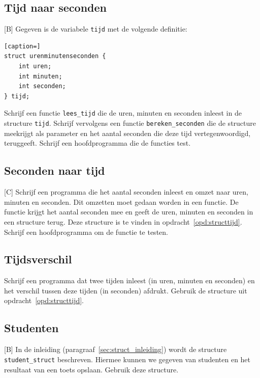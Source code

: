 \documentclass[a4paper,10pt,fleqn,twoside]{article}
\begin{document}
\begin{figure}[H]
\centering
{}
\end{figure}

\subsection{Tijd naar seconden}[B]
\label{opd:structtijd}
Gegeven is de variabele \lstinline|tijd| met de volgende definitie:

\begin{lstlisting}[caption=]
struct urenminutenseconden {
    int uren;
    int minuten;
    int seconden;
} tijd;
\end{lstlisting}

Schrijf een functie \lstinline|lees_tijd| die de uren, minuten en seconden inleest in de structure \lstinline|tijd|. Schrijf vervolgens een functie \lstinline|bereken_seconden| die de structure meekrijgt als parameter en het aantal seconden die deze tijd vertegenwoordigd, teruggeeft. Schrijf een hoofdprogramma die de functies test.

\subsection{Seconden naar tijd}[C]
Schrijf een programma die het aantal seconden inleest en omzet naar uren, minuten en seconden. Dit omzetten moet gedaan worden in een functie. De functie krijgt het aantal seconden mee en geeft de uren, minuten en seconden in een structure terug. Deze structure is te vinden in opdracht~\ref{opd:structtijd}. Schrijf een hoofdprogramma om de functie te testen.
 
 
\subsection{Tijdsverschil}
Schrijf een programma dat twee tijden inleest (in uren, minuten en seconden) en het verschil tussen deze tijden (in seconden) afdrukt. Gebruik de structure uit opdracht~\ref{opd:structtijd}. 
 
\subsection{Studenten}[B]
\label{sec:struct_stud}
In de inleiding (paragraaf~\ref{sec:struct_inleiding}) wordt de structure \lstinline|student_struct| beschreven. Hiermee kunnen we gegeven van studenten en het resultaat van een toets opslaan. Gebruik deze structure.
\end{document}
